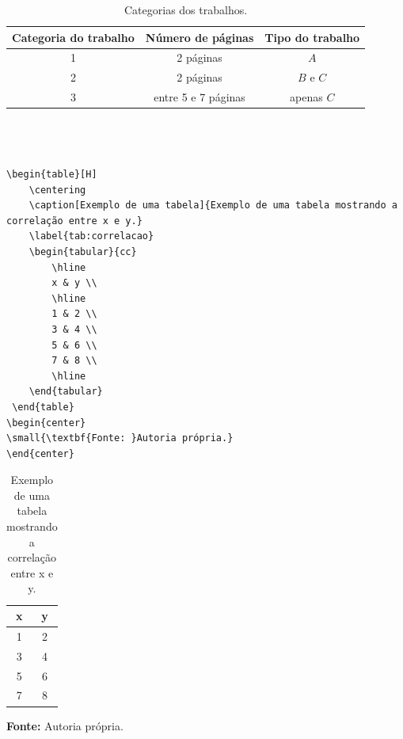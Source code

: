 \documentclass{modelo}
\begin{document}
   
\begin{table}[H]
 \caption{ {\small Categorias dos trabalhos.}}
 \begin{center}
 \begin{tabular}{|c|c|c|}
  \hline  
   Categoria do trabalho  & Número de páginas & Tipo do trabalho\\
  \hline
   1          & 2 páginas & $A$   \\
  \hline
   2          & 2 páginas & $B$ e $C$ \\
  \hline
   3          & entre 5 e 7 páginas & apenas $C$ \\
  \hline
 \end{tabular} 
 \label{tabela01}
 \end{center} 
\end{table} 


\begin{verbatim}
 
 
 
\begin{table}[H]
 	\centering
 	\caption[Exemplo de uma tabela]{Exemplo de uma tabela mostrando a correlação entre x e y.}
 	\label{tab:correlacao}
 	\begin{tabular}{cc}
 		\hline
 		x & y \\
 		\hline
 		1 & 2 \\
 		3 & 4 \\
 		5 & 6 \\
 		7 & 8 \\
 		\hline
 	\end{tabular}
 \end{table}
\begin{center}
\small{\textbf{Fonte: }Autoria própria.}
\end{center}   
\end{verbatim}    
 \begin{table}[H]
	\centering
	\caption[Exemplo de uma tabela]{Exemplo de uma tabela mostrando a correlação entre x e y.}
	\label{tab:correlacao}
	\begin{tabular}{cc}
		\hline
		x & y \\
		\hline
		1 & 2 \\
		3 & 4 \\
		5 & 6 \\
		7 & 8 \\
		\hline
	\end{tabular}
\end{table}
\begin{center}
	\small{\textbf{Fonte: }Autoria própria.}
\end{center}
    
\end{document}
